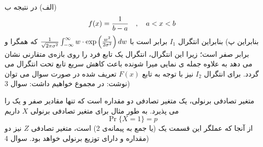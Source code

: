 \documentclass[10pt,letterpaper]{article}
\begin{document}
الف)
در نتیجه
ب)
\[
f(x)={1\over b-a}\quad,\quad a<x<b
\]
بنابراین
پ)
بنابراین
انتگرال $I_1$ برابر است با $
{1\over \sqrt{2\pi\sigma^2}}
\int_{-\infty}^\infty
w\cdot\exp\left({w^2\over 2\sigma^2}\right)
dw
$
 که همگرا و برابر صفر است؛ زیرا این انتگرال، انتگرال یک تابع فرد را روی بازه‌ی متقارنی نشان می دهد به علاوه جمله ی نمایی میرا شونده باعث کاهش سریع تابع تحت انتگرال می گردد. برای انتگرال $I_2$ نیز با توجه به تابع $F(x)$ تعریف شده در صورت سوال می توان نوشت:
در مجموع خواهیم داشت:
سوال 3) 

متغیر تصادفی برنولی، یک متغیر تصادفی دو مقداره است که تنها مقادیر صفر و یک را می پذیرد. به طور مثال برای متغیر تصادفی برنولی $X$ داریم
$$
\Pr\{X=1\}=p
$$
از آنجا که عملگر این قسمت یک  (یا جمع به پیمانه‌ی 2) است، متغیر تصادفی $Z$ نیز دو مقداره و دارای توزیع برنولی خواهد بود.
سوال 4)
\end{document}
